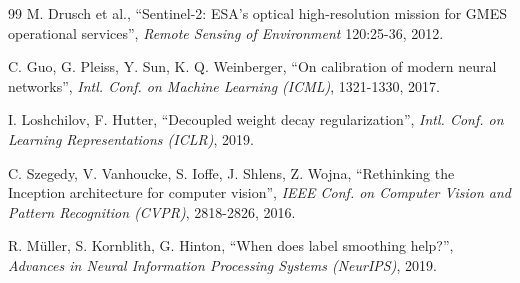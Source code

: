 \documentclass[twoside,a4paper,11pt]{article}
\begin{document}
\begin{thebibliography}{99}
M. Drusch et al.,
``Sentinel-2: ESA's optical high-resolution mission for GMES operational services'',
{\em Remote Sensing of Environment} 120:25-36, 2012.

C. Guo, G. Pleiss, Y. Sun, K. Q. Weinberger,
``On calibration of modern neural networks'',
{\em Intl. Conf. on Machine Learning (ICML)}, 1321-1330, 2017.

I. Loshchilov, F. Hutter,
``Decoupled weight decay regularization'',
{\em Intl. Conf. on Learning Representations (ICLR)}, 2019.

C. Szegedy, V. Vanhoucke, S. Ioffe, J. Shlens, Z. Wojna,
``Rethinking the Inception architecture for computer vision'',
{\em IEEE Conf. on Computer Vision and Pattern Recognition (CVPR)}, 2818-2826, 2016.

R. M\"uller, S. Kornblith, G. Hinton,
``When does label smoothing help?'',
{\em Advances in Neural Information Processing Systems (NeurIPS)}, 2019.

\end{thebibliography}
\end{document}
